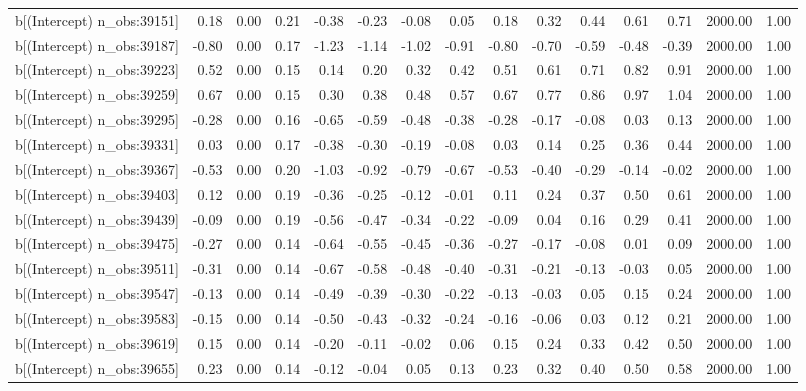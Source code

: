 \begin{table}[ht]
\begin{tabular}{rrrrrrrrrrrrrrr}
  b[(Intercept) n\_obs:39151] & 0.18 & 0.00 & 0.21 & -0.38 & -0.23 & -0.08 & 0.05 & 0.18 & 0.32 & 0.44 & 0.61 & 0.71 & 2000.00 & 1.00 \\ 
  b[(Intercept) n\_obs:39187] & -0.80 & 0.00 & 0.17 & -1.23 & -1.14 & -1.02 & -0.91 & -0.80 & -0.70 & -0.59 & -0.48 & -0.39 & 2000.00 & 1.00 \\ 
  b[(Intercept) n\_obs:39223] & 0.52 & 0.00 & 0.15 & 0.14 & 0.20 & 0.32 & 0.42 & 0.51 & 0.61 & 0.71 & 0.82 & 0.91 & 2000.00 & 1.00 \\ 
  b[(Intercept) n\_obs:39259] & 0.67 & 0.00 & 0.15 & 0.30 & 0.38 & 0.48 & 0.57 & 0.67 & 0.77 & 0.86 & 0.97 & 1.04 & 2000.00 & 1.00 \\ 
  b[(Intercept) n\_obs:39295] & -0.28 & 0.00 & 0.16 & -0.65 & -0.59 & -0.48 & -0.38 & -0.28 & -0.17 & -0.08 & 0.03 & 0.13 & 2000.00 & 1.00 \\ 
  b[(Intercept) n\_obs:39331] & 0.03 & 0.00 & 0.17 & -0.38 & -0.30 & -0.19 & -0.08 & 0.03 & 0.14 & 0.25 & 0.36 & 0.44 & 2000.00 & 1.00 \\ 
  b[(Intercept) n\_obs:39367] & -0.53 & 0.00 & 0.20 & -1.03 & -0.92 & -0.79 & -0.67 & -0.53 & -0.40 & -0.29 & -0.14 & -0.02 & 2000.00 & 1.00 \\ 
  b[(Intercept) n\_obs:39403] & 0.12 & 0.00 & 0.19 & -0.36 & -0.25 & -0.12 & -0.01 & 0.11 & 0.24 & 0.37 & 0.50 & 0.61 & 2000.00 & 1.00 \\ 
  b[(Intercept) n\_obs:39439] & -0.09 & 0.00 & 0.19 & -0.56 & -0.47 & -0.34 & -0.22 & -0.09 & 0.04 & 0.16 & 0.29 & 0.41 & 2000.00 & 1.00 \\ 
  b[(Intercept) n\_obs:39475] & -0.27 & 0.00 & 0.14 & -0.64 & -0.55 & -0.45 & -0.36 & -0.27 & -0.17 & -0.08 & 0.01 & 0.09 & 2000.00 & 1.00 \\ 
  b[(Intercept) n\_obs:39511] & -0.31 & 0.00 & 0.14 & -0.67 & -0.58 & -0.48 & -0.40 & -0.31 & -0.21 & -0.13 & -0.03 & 0.05 & 2000.00 & 1.00 \\ 
  b[(Intercept) n\_obs:39547] & -0.13 & 0.00 & 0.14 & -0.49 & -0.39 & -0.30 & -0.22 & -0.13 & -0.03 & 0.05 & 0.15 & 0.24 & 2000.00 & 1.00 \\ 
  b[(Intercept) n\_obs:39583] & -0.15 & 0.00 & 0.14 & -0.50 & -0.43 & -0.32 & -0.24 & -0.16 & -0.06 & 0.03 & 0.12 & 0.21 & 2000.00 & 1.00 \\ 
  b[(Intercept) n\_obs:39619] & 0.15 & 0.00 & 0.14 & -0.20 & -0.11 & -0.02 & 0.06 & 0.15 & 0.24 & 0.33 & 0.42 & 0.50 & 2000.00 & 1.00 \\ 
  b[(Intercept) n\_obs:39655] & 0.23 & 0.00 & 0.14 & -0.12 & -0.04 & 0.05 & 0.13 & 0.23 & 0.32 & 0.40 & 0.50 & 0.58 & 2000.00 & 1.00 \\ 

\end{tabular}
\end{table}
